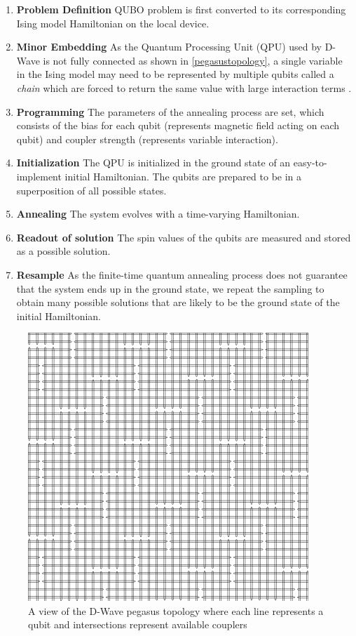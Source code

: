 \begin{enumerate}
    \item \textbf{Problem Definition} QUBO problem is first converted to its corresponding Ising model Hamiltonian on the local device.
    \item \textbf{Minor Embedding} As the Quantum Processing Unit (QPU) used by D-Wave is not fully connected as shown in \autoref{pegasustopology}, a single variable in the Ising model may need to be represented by multiple qubits called a \textit{chain} which are forced to return the same value with large interaction terms \cite{b16}.
    \item \textbf{Programming} The parameters of the annealing process are set, which consists of the bias for each qubit (represents magnetic field acting on each qubit) and coupler strength (represents variable interaction).
    \item \textbf{Initialization} The QPU is initialized in the ground state of an easy-to-implement initial Hamiltonian. The qubits are prepared to be in a superposition of all possible states.
    \item \textbf{Annealing} The system evolves with a time-varying Hamiltonian.
    \item \textbf{Readout of solution} The spin values of the qubits are measured and stored as a possible solution.
    \item \textbf{Resample} As the finite-time quantum annealing process does not guarantee that the system ends up in the ground state, we repeat the sampling to obtain many possible solutions that are likely to be the ground state of the initial Hamiltonian.
\end{enumerate}

\begin{figure}[h!]
    \centering
    \includegraphics[width=0.6\linewidth]{images/pegasus_topology.png}
    \caption{A view of the D-Wave pegasus topology where each line represents a qubit and intersections represent available couplers~\protect\cite{dwaveadvantage}}
    \label{pegasustopology}
\end{figure}


